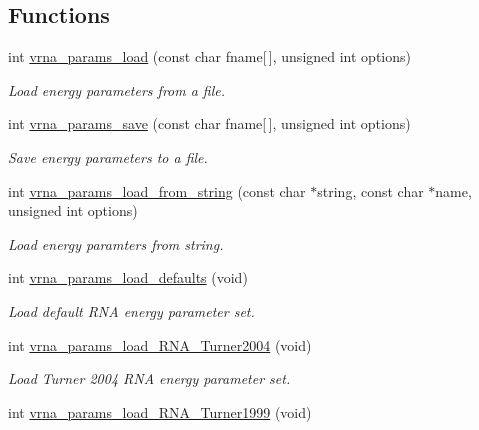 \subsection*{Functions}
\begin{DoxyCompactItemize}
\item 
int \mbox{\hyperlink{group__energy__parameters__rw_gabb0583595c67094986ef90cb4f1c7555}{vrna\+\_\+params\+\_\+load}} (const char fname\mbox{[}$\,$\mbox{]}, unsigned int options)
\begin{DoxyCompactList}\small\item\em Load energy parameters from a file. \end{DoxyCompactList}\item 
int \mbox{\hyperlink{group__energy__parameters__rw_ga0de3731b3e4017c52bd678549f6c4ae5}{vrna\+\_\+params\+\_\+save}} (const char fname\mbox{[}$\,$\mbox{]}, unsigned int options)
\begin{DoxyCompactList}\small\item\em Save energy parameters to a file. \end{DoxyCompactList}\item 
int \mbox{\hyperlink{group__energy__parameters__rw_gabcd9cc7040a6b633b56b1cbd6a14d68e}{vrna\+\_\+params\+\_\+load\+\_\+from\+\_\+string}} (const char $\ast$string, const char $\ast$name, unsigned int options)
\begin{DoxyCompactList}\small\item\em Load energy paramters from string. \end{DoxyCompactList}\item 
int \mbox{\hyperlink{group__energy__parameters__rw_ga413bc688695c9a707dbcc678412d6792}{vrna\+\_\+params\+\_\+load\+\_\+defaults}} (void)
\begin{DoxyCompactList}\small\item\em Load default R\+NA energy parameter set. \end{DoxyCompactList}\item 
int \mbox{\hyperlink{group__energy__parameters__rw_ga7327fe66ef60c33ba80a87c04db0ee83}{vrna\+\_\+params\+\_\+load\+\_\+\+R\+N\+A\+\_\+\+Turner2004}} (void)
\begin{DoxyCompactList}\small\item\em Load Turner 2004 R\+NA energy parameter set. \end{DoxyCompactList}\item 
int \mbox{\hyperlink{group__energy__parameters__rw_ga804393b6dfe06a2c6cae89219dffabb1}{vrna\+\_\+params\+\_\+load\+\_\+\+R\+N\+A\+\_\+\+Turner1999}} (void)

\end{DoxyCompactItemize}
